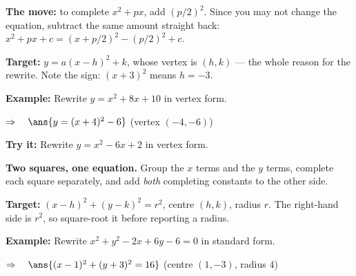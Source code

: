 \documentclass[12pt]{article}
\begin{document}


\begin{formulabox}
\textbf{The move:} to complete $x^2 + px$, add $(p/2)^2$. Since you may not change the
equation, subtract the same amount straight back: $x^2 + px + c = (x + p/2)^2 - (p/2)^2 + c$.\par
\textbf{Target:} $y = a(x-h)^2 + k$, whose vertex is $(h, k)$ --- the whole reason for the
rewrite. Note the sign: $(x+3)^2$ means $h = -3$.
\end{formulabox}

\begin{examplebox}
\textbf{Example:} \quad Rewrite $y = x^2 + 8x + 10$ in vertex form.

$\Rightarrow\quad \ans{y = (x+4)^2 - 6}$ \quad (vertex $(-4, -6)$)
\end{examplebox}

\begin{tryitbox}
\textbf{Try it:} \quad Rewrite $y = x^2 - 6x + 2$ in vertex form.\\[2pt]
\end{tryitbox}


\begin{formulabox}
\textbf{Two squares, one equation.} Group the $x$ terms and the $y$ terms, complete each
square separately, and add \emph{both} completing constants to the other side.\par
\textbf{Target:} $(x-h)^2 + (y-k)^2 = r^2$, centre $(h, k)$, radius $r$. The right-hand side
is $r^2$, so square-root it before reporting a radius.
\end{formulabox}

\begin{examplebox}
\textbf{Example:} \quad Rewrite $x^2 + y^2 - 2x + 6y - 6 = 0$ in standard form.

$\Rightarrow\quad \ans{(x-1)^2 + (y+3)^2 = 16}$ \quad (centre $(1,-3)$, radius $4$)
\end{examplebox}
\end{document}
